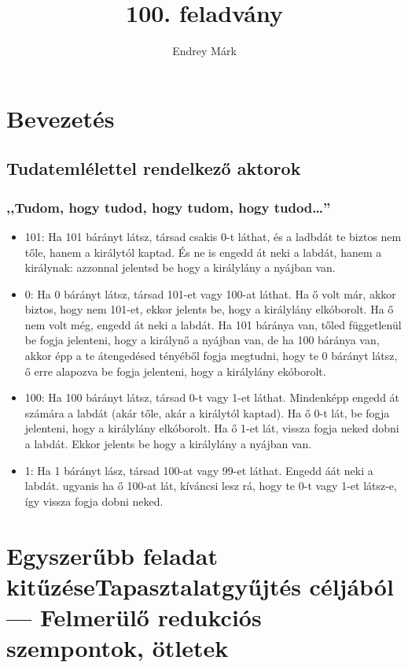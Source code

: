 \documentclass{article}
\title{100. feladvány}
\author{Endrey Márk}
\begin{document}
	\maketitle

	\tableofcontents

	\section{Bevezetés}

	\subsection{Tudatemlélettel rendelkező aktorok}

	\subsubsection{,,Tudom, hogy tudod, hogy tudom, hogy tudod\dots''}

	\begin{itemize}
		\item 101: Ha 101 bárányt látsz, társad csakis 0-t láthat, és a ladbdát te biztos nem tőle, hanem a királytól kaptad. És ne is engedd át neki a labdát, hanem a királynak: azzonnal jelentsd be hogy a királylány a nyájban van.
		\item 0: Ha   0 bárányt látsz, társad 101-et vagy 100-at láthat. Ha ő volt már, akkor biztos, hogy nem 101-et, ekkor jelents be, hogy a királylány elkóborolt. Ha ő nem volt még, engedd át neki a labdát. Ha 101 báránya van, tőled függetlenül be fogja jelenteni, hogy a királynő a nyájban van, de ha 100 báránya van, akkor  épp a te átengedésed tényéből fogja megtudni, hogy te 0 bárányt látsz, ő erre alapozva be fogja jelenteni, hogy a királylány ekóborolt.
		\item 100: Ha 100 bárányt látsz, társad 0-t vagy 1-et láthat. Mindenképp engedd át számára a labdát (akár tőle, akár a királytól kaptad). Ha ő 0-t lát, be fogja jelenteni, hogy a királylány elkóborolt. Ha ő 1-et lát, vissza fogja neked dobni a labdát. Ekkor jelents be hogy a királylány a nyájban van.
		\item 1: Ha 1 bárányt lász, társad 100-at vagy 99-et láthat. Engedd áát neki a labdát. ugyanis ha ő 100-at lát, kíváncsi lesz rá, hogy te 0-t vagy 1-et látsz-e, így vissza fogja dobni neked.
	\end{itemize}

	\section{Egyszerűbb feladat kitűzéseTapasztalatgyűjtés céljából --- Felmerülő redukciós szempontok, ötletek}
\end{document}
